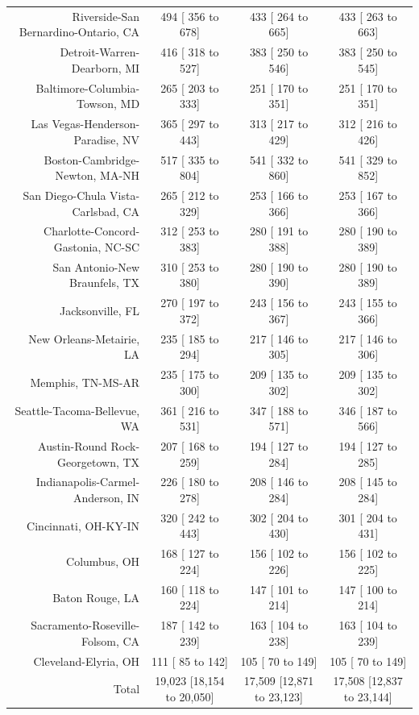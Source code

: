 \documentclass{article}
\begin{document}
\begin{table}[H]
\begin{tabular}{|r|c|c|c|}
		Riverside-San Bernardino-Ontario, CA &    494 [   356 to    678] &    433 [   264 to    665] &    433 [   263 to    663]\\
		Detroit-Warren-Dearborn, MI &    416 [   318 to    527] &    383 [   250 to    546] &    383 [   250 to    545]\\
		Baltimore-Columbia-Towson, MD &    265 [   203 to    333] &    251 [   170 to    351] &    251 [   170 to    351]\\
		Las Vegas-Henderson-Paradise, NV &    365 [   297 to    443] &    313 [   217 to    429] &    312 [   216 to    426]\\
		Boston-Cambridge-Newton, MA-NH &    517 [   335 to    804] &    541 [   332 to    860] &    541 [   329 to    852]\\
		San Diego-Chula Vista-Carlsbad, CA &    265 [   212 to    329] &    253 [   166 to    366] &    253 [   167 to    366]\\
		Charlotte-Concord-Gastonia, NC-SC &    312 [   253 to    383] &    280 [   191 to    388] &    280 [   190 to    389]\\
		San Antonio-New Braunfels, TX &    310 [   253 to    380] &    280 [   190 to    390] &    280 [   190 to    389]\\
		Jacksonville, FL &    270 [   197 to    372] &    243 [   156 to    367] &    243 [   155 to    366]\\
		New Orleans-Metairie, LA &    235 [   185 to    294] &    217 [   146 to    305] &    217 [   146 to    306]\\
		Memphis, TN-MS-AR &    235 [   175 to    300] &    209 [   135 to    302] &    209 [   135 to    302]\\
		Seattle-Tacoma-Bellevue, WA &    361 [   216 to    531] &    347 [   188 to    571] &    346 [   187 to    566]\\
		Austin-Round Rock-Georgetown, TX &    207 [   168 to    259] &    194 [   127 to    284] &    194 [   127 to    285]\\
		Indianapolis-Carmel-Anderson, IN &    226 [   180 to    278] &    208 [   146 to    284] &    208 [   145 to    284]\\
		Cincinnati, OH-KY-IN &    320 [   242 to    443] &    302 [   204 to    430] &    301 [   204 to    431]\\
		Columbus, OH &    168 [   127 to    224] &    156 [   102 to    226] &    156 [   102 to    225]\\
		Baton Rouge, LA &    160 [   118 to    224] &    147 [   101 to    214] &    147 [   100 to    214]\\
		Sacramento-Roseville-Folsom, CA &    187 [   142 to    239] &    163 [   104 to    238] &    163 [   104 to    239]\\
		Cleveland-Elyria, OH &    111 [    85 to    142] &    105 [    70 to    149] &    105 [    70 to    149]\\
		
		\hline
		Total & 19,023 [18,154 to 20,050] & 17,509 [12,871 to 23,123] & 17,508 [12,837 to 23,144]\\
		\hline
	\end{tabular}
\end{table}
\end{document}
